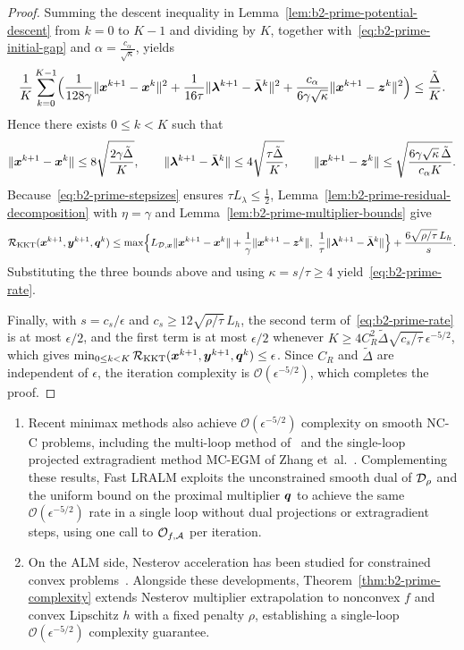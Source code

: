 \begin{proof}
Summing the descent inequality in
Lemma~\ref{lem:b2-prime-potential-descent} from \(k=0\) to \(K-1\) and
dividing by \(K\), together with~\eqref{eq:b2-prime-initial-gap} and
\(\alpha=\frac{c_\alpha}{\sqrt{\kappa}}\), yields
\[
    \frac1K\sum_{k=0}^{K-1}\Bigl(
    \frac{1}{128\gamma}\|\bm{x}^{k+1}-\bm{x}^k\|^2
    +\frac{1}{16\tau}\|\bm{\lambda}^{k+1}-\bar{\bm{\lambda}}^k\|^2
    +\frac{c_\alpha}{6\gamma\sqrt{\kappa}}\|\bm{x}^{k+1}-\bm{z}^k\|^2\Bigr)
    \le\frac{\tilde{\Delta}}{K}.
\]
Hence there exists \(0\le k<K\) such that
\[
    \|\bm{x}^{k+1}-\bm{x}^k\|\le8\sqrt{\frac{2\gamma\tilde{\Delta}}{K}},
    \qquad
    \|\bm{\lambda}^{k+1}-\bar{\bm{\lambda}}^k\|\le4\sqrt{\frac{\tau\tilde{\Delta}}{K}},
    \qquad
    \|\bm{x}^{k+1}-\bm{z}^k\|\le\sqrt{\frac{6\gamma\sqrt{\kappa}\,\tilde{\Delta}}{c_\alpha K}}.
\]
Because~\eqref{eq:b2-prime-stepsizes} ensures \(\tau L_\lambda\le\frac12\),
Lemma~\ref{lem:b2-prime-residual-decomposition} with \(\eta=\gamma\) and
Lemma~\ref{lem:b2-prime-multiplier-bounds} give
\[
    \mathcal R_{\mathrm{KKT}}(\bm{x}^{k+1},\bm{y}^{k+1},\bm{q}^k)
    \le\max\Bigl\{L_{\mathcal{D},\bm{x}}\|\bm{x}^{k+1}-\bm{x}^k\|
    +\frac1\gamma\|\bm{x}^{k+1}-\bm{z}^k\|,\
    \frac1\tau\|\bm{\lambda}^{k+1}-\bar{\bm{\lambda}}^k\|\Bigr\}
    +\frac{6\sqrt{\rho/\tau}\,L_h}{s}.
\]
Substituting the three bounds above and using \(\kappa=s/\tau\ge4\)
yield~\eqref{eq:b2-prime-rate}.

Finally, with \(s=c_s/\epsilon\) and \(c_s\ge12\sqrt{\rho/\tau}\,L_h\), the
second term of~\eqref{eq:b2-prime-rate} is at most \(\epsilon/2\), and the
first term is at most \(\epsilon/2\) whenever
\(K\ge4C_R^2\tilde{\Delta}\sqrt{c_s/\tau}\,\epsilon^{-5/2}\), which
gives \(\min_{0\le k<K}\mathcal R_{\mathrm{KKT}}(\bm{x}^{k+1},\bm{y}^{k+1},\bm{q}^k)\le\epsilon\).
Since \(C_R\) and \(\tilde{\Delta}\) are independent of \(\epsilon\), the
iteration complexity is \(\mathcal O(\epsilon^{-5/2})\), which completes the
proof.
\end{proof}

\begin{remark}
\begin{enumerate}[label=(\roman*)]
\item Recent minimax methods also achieve \(\mathcal O(\epsilon^{-5/2})\)
complexity on smooth NC-C problems, including
the multi-loop method of~\cite{ke2026efficient} and the single-loop projected extragradient method MC-EGM of Zhang
et~al.~\cite{zhang2026matching}. Complementing
these results, Fast LRALM exploits the unconstrained smooth dual of
\(\mathcal{D}_\rho\) and the uniform bound on the proximal multiplier \(\bm{q}\) to
achieve the same \(\mathcal O(\epsilon^{-5/2})\) rate in a single loop without
dual projections or extragradient steps, using one call to \(\mathcal O_{f,\mathcal{A}}\)
per iteration.
\item On the ALM side, Nesterov acceleration has been studied
for constrained convex
problems~\cite{he2010acceleration,he2026augmented}.
Alongside these developments, Theorem~\ref{thm:b2-prime-complexity} extends
Nesterov multiplier extrapolation to nonconvex \(f\) and convex Lipschitz \(h\)
with a fixed penalty \(\rho\), establishing a single-loop
\(\mathcal O(\epsilon^{-5/2})\) complexity guarantee.
\end{enumerate}
\end{remark}

